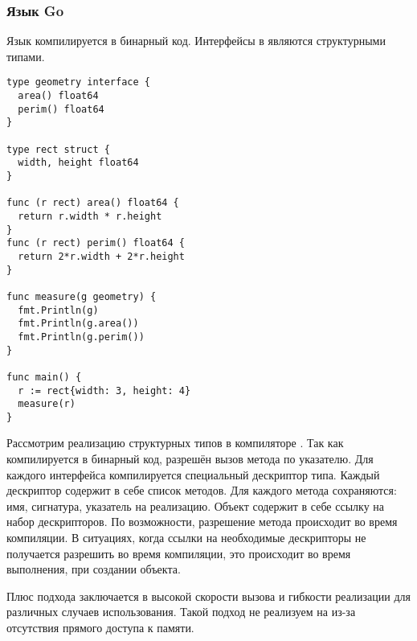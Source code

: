 \subsubsection{Язык Go}
Язык  компилируется в бинарный код. Интерфейсы в  являются структурными типами\cite{go}.

\begin{verbatim}
type geometry interface {
  area() float64
  perim() float64
}

type rect struct {
  width, height float64
}

func (r rect) area() float64 {
  return r.width * r.height
}
func (r rect) perim() float64 {
  return 2*r.width + 2*r.height
}

func measure(g geometry) {
  fmt.Println(g)
  fmt.Println(g.area())
  fmt.Println(g.perim())
}

func main() {
  r := rect{width: 3, height: 4}
  measure(r)
}
\end{verbatim}

Рассмотрим реализацию структурных типов в компиляторе . Так как  компилируется в бинарный код, разрешён вызов метода по указателю. Для каждого интерфейса компилируется специальный дескриптор типа. Каждый дескриптор содержит в себе список методов. Для каждого метода сохраняются: имя, сигнатура, указатель на реализацию. Объект содержит в себе ссылку на набор дескрипторов. По возможности, разрешение метода происходит во время компиляции. В ситуациях, когда ссылки на необходимые дескрипторы не получается разрешить во время компиляции, это происходит во время выполнения, при создании объекта.

Плюс подхода заключается в высокой скорости вызова и гибкости реализации для различных случаев использования. Такой подход не реализуем на  из-за отсутствия прямого доступа к памяти.
